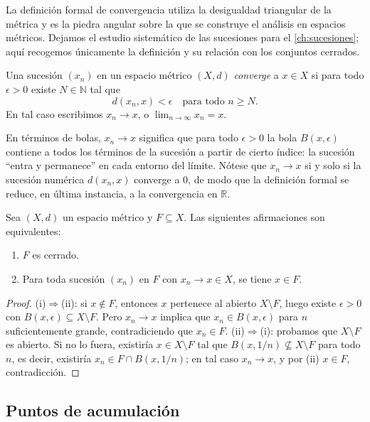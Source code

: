 La definición formal de convergencia utiliza la desigualdad triangular de la métrica y es la piedra angular sobre la que se construye el análisis en espacios métricos. Dejamos el estudio sistemático de las sucesiones para el \cref{ch:sucesiones}; aquí recogemos únicamente la definición y su relación con los conjuntos cerrados.

\begin{definition}
\label{def:convergencia-sucesiones}
Una sucesión $(x_n)$ en un espacio métrico $(X,d)$ \emph{converge} a $x\in X$ si para todo $\epsilon>0$ existe $N\in\mathbb{N}$ tal que
\[
  d(x_n,x)<\epsilon\quad\text{para todo }n\geq N.
\]
En tal caso escribimos $x_n\to x$, o $\lim_{n\to\infty}x_n=x$.
\end{definition}

En términos de bolas, $x_n\to x$ significa que para todo $\epsilon>0$ la bola $B(x,\epsilon)$ contiene a todos los términos de la sucesión a partir de cierto índice: la sucesión ``entra y permanece'' en cada entorno del límite. Nótese que $x_n\to x$ si y solo si la sucesión numérica $d(x_n,x)$ converge a $0$, de modo que la definición formal se reduce, en última instancia, a la convergencia en $\mathbb{R}$.

\begin{proposition}
\label{prop:cerrados-limites}
Sea $(X,d)$ un espacio métrico y $F\subseteq X$. Las siguientes afirmaciones son equivalentes:
\begin{enumerate}
  \item[(i)] $F$ es cerrado.
  \item[(ii)] Para toda sucesión $(x_n)$ en $F$ con $x_n\to x\in X$, se tiene $x\in F$.
\end{enumerate}
\end{proposition}
\begin{proof}
(i)$\Rightarrow$(ii): si $x\notin F$, entonces $x$ pertenece al abierto $X\setminus F$, luego existe $\epsilon>0$ con $B(x,\epsilon)\subseteq X\setminus F$. Pero $x_n\to x$ implica que $x_n\in B(x,\epsilon)$ para $n$ suficientemente grande, contradiciendo que $x_n\in F$.
(ii)$\Rightarrow$(i): probamos que $X\setminus F$ es abierto. Si no lo fuera, existiría $x\in X\setminus F$ tal que $B(x,1/n)\nsubseteq X\setminus F$ para todo $n$, es decir, existiría $x_n\in F\cap B(x,1/n)$; en tal caso $x_n\to x$, y por (ii) $x\in F$, contradicción.
\end{proof}

\subsection{Puntos de acumulación}

